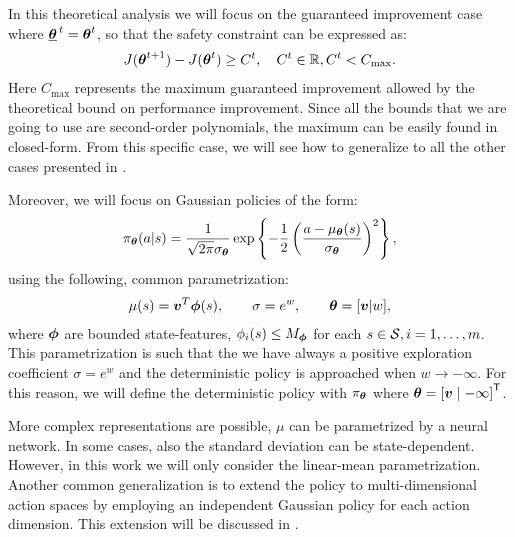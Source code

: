 In this theoretical analysis we will focus on the guaranteed improvement case where ${\underline{{\boldsymbol{\theta}}}^{\,t}}={\boldsymbol{\theta}}^t$, so that the safety constraint can be expressed as:
%
\begin{align*}
J({\boldsymbol{\theta}}^{t+1}) - J({\boldsymbol{\theta}}^t) \geq C^t, \quad C^t \in \mathbb{R}, C^t < C_{\text{max}}.
\end{align*}
Here $C_\text{max}$ represents the maximum guaranteed improvement allowed by the theoretical bound on performance improvement. Since all the bounds that we are going to use are second-order polynomials, the maximum can be easily found in closed-form. From this specific case, we will see how to generalize to all the other cases presented in .

Moreover, we will focus on Gaussian policies of the form:
\[
	\pi_{{\boldsymbol{\theta}}}(a\vert s) = \frac{1}{\sqrt{2\pi}\sigma_{{\boldsymbol{\theta}}}}\exp\left\{-\frac{1}{2}\left(\frac{a - \mu_{{\boldsymbol{\theta}}}(s)}{\sigma_{{\boldsymbol{\theta}}}}\right)^2\right\},
\]
using the following, common parametrization:
\begin{align}\label{eq:parametrization}
\mu(s)=\boldsymbol{v}^T\boldsymbol{\phi}(s), \qquad \sigma=e^w, \qquad {\boldsymbol{\theta}}=[\boldsymbol{v}\vert w],
\end{align}
where $\boldsymbol{\phi}$ are bounded state-features, \ie $\phi_i(s) \leq M_{\boldsymbol{\phi}}$ for each $s\in\mathcal{S}, i=1,\dots,m$.
This parametrization is such that the we have always a positive exploration coefficient $\sigma=e^w$ and the deterministic policy is approached when $w \rightarrow -\infty$. For this reason, we will define the deterministic policy with $\pi_{{\boldsymbol{\theta}}}$ where ${\boldsymbol{\theta}} = {[\boldsymbol{v} \mid -\infty]}^{\mathsf{T}}$.


More complex representations are possible, \eg $\mu$ can be parametrized by a neural network. In some cases, also the standard deviation can be state-dependent. However, in this work we will only consider the linear-mean parametrization. \\
Another common generalization is to extend the policy to multi-dimensional action spaces by employing an independent Gaussian policy for each action dimension. This extension will be discussed in .

